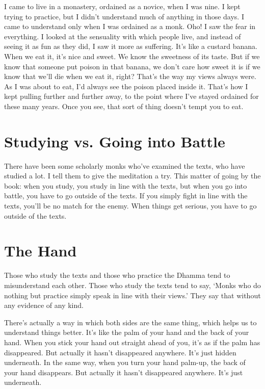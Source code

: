 I came to live in a monastery, ordained as a novice, when I was nine. I kept trying to practice, but I didn't understand much of anything in those days. I came to understand only when I was ordained as a monk. Oho! I saw the fear in everything. I looked at the sensuality with which people live, and instead of seeing it as fun as they did, I saw it more as suffering. It's like a custard banana. When we eat it, it's nice and sweet. We know the sweetness of its taste. But if we know that someone put poison in that banana, we don't care how sweet it is if we know that we'll die when we eat it, right? That's the way my views always were. As I was about to eat, I'd always see the poison placed inside it. That's how I kept pulling further and further away, to the point where I've stayed ordained for these many years. Once you see, that sort of thing doesn't tempt you to eat.

\vspace*{-\baselineskip}
\section{Studying vs. Going into Battle}

There have been some scholarly monks who've examined the texts, who have studied a lot. I tell them to give the meditation a try. This matter of going by the book: when you study, you study in line with the texts, but when you go into battle, you have to go outside of the texts. If you simply fight in line with the texts, you'll be no match for the enemy. When things get serious, you have to go outside of the texts.

\clearpage

\section{The Hand}

Those who study the texts and those who practice the Dhamma tend to misunderstand each other. Those who study the texts tend to say, `Monks who do nothing but practice simply speak in line with their views.' They say that without any evidence of any kind.

There's actually a way in which both sides are the same thing, which helps us to understand things better. It's like the palm of your hand and the back of your hand. When you stick your hand out straight ahead of you, it's as if the palm has disappeared. But actually it hasn't disappeared anywhere. It's just hidden underneath. In the same way, when you turn your hand palm-up, the back of your hand disappears. But actually it hasn't disappeared anywhere. It's just underneath.

